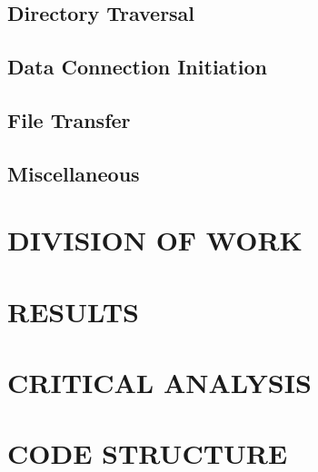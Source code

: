 \documentclass[10pt,twocolumn]{witseiepaper}
\begin{document}
\subsection{Directory Traversal}

\subsection{Data Connection Initiation}

\subsection{File Transfer}

\subsection{Miscellaneous}




\section{DIVISION OF WORK}

\section{RESULTS}\label{results}

\section{CRITICAL ANALYSIS}

\section{CODE STRUCTURE}

\end{document}
